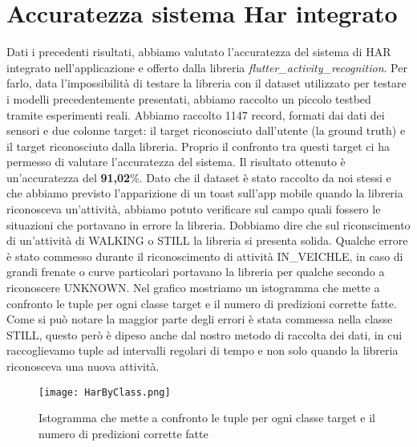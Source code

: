\documentclass[../../Report.tex]{subfiles}
\begin{document}
\section{Accuratezza sistema Har integrato}
Dati i precedenti risultati, abbiamo valutato l'accuratezza del sistema di HAR integrato nell'applicazione e offerto dalla libreria \emph{flutter\_activity\_recognition}. Per farlo, data l'impossibilità di testare la libreria con il dataset utilizzato per testare i modelli precedentemente presentati, abbiamo raccolto un piccolo testbed tramite esperimenti reali. Abbiamo raccolto 1147
record, formati dai dati dei sensori e due colonne target: il target riconosciuto dall'utente (la ground truth) e il target riconosciuto dalla libreria. Proprio il confronto tra questi target ci ha permesso di valutare l'accuratezza del sistema. Il risultato ottenuto è un'accuratezza del \textbf{91,02}\%. Dato che il dataset è stato raccolto da noi stessi e che abbiamo previsto l'apparizione di un toast sull'app mobile quando la libreria riconosceva un'attività, abbiamo potuto verificare sul campo quali fossero le situazioni che portavano in errore la libreria. Dobbiamo dire che sul riconscimento di un'attività di WALKING o STILL la libreria si presenta solida. Qualche errore è stato commesso durante il riconoscimento di attività IN\_VEICHLE, in caso di grandi frenate o curve particolari portavano la libreria per qualche secondo a riconoscere UNKNOWN. Nel grafico mostriamo un istogramma che mette a confronto le tuple per ogni classe target e il numero di predizioni corrette fatte. Come si può notare la maggior parte degli errori è stata commessa nella classe STILL, questo però è dipeso anche dal nostro metodo di raccolta dei dati, in cui raccoglievamo tuple ad intervalli regolari di tempo e non solo quando la libreria riconosceva una nuova attività.
\begin{figure}[H]
    \centering
    \texttt{[image: HarByClass.png]}
    \caption{Istogramma che mette a confronto le tuple per ogni classe target e il numero di predizioni corrette fatte}
    \label{fig:accuracy}
\end{figure}
\end{document}
